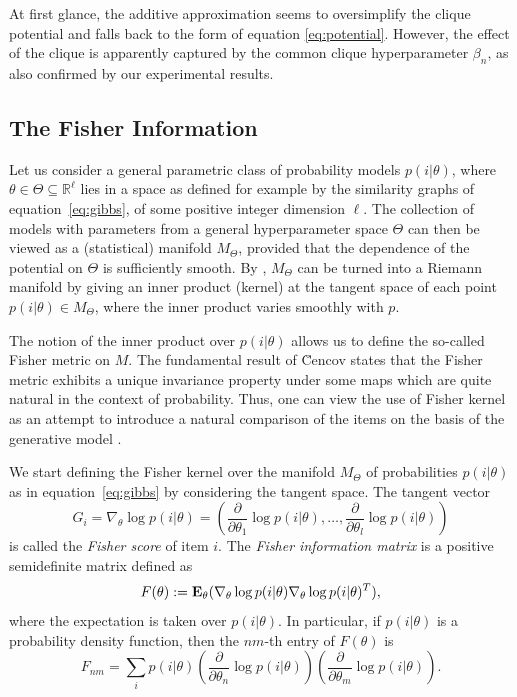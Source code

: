 \documentclass[preprint]{sig-alternate-05-2015}
\begin{document}
At first glance, the additive approximation seems to oversimplify the clique potential and falls back to the form of equation \eqref{eq:potential}. However, the effect of the clique is apparently captured by the common clique hyperparameter $\beta_{n}$, as also confirmed by our experimental results.

\subsection{The Fisher Information}

Let us consider a general parametric class of probability models $p(i| \theta)$, where $\theta\in \Theta \subseteq \mathbb{R}^\ell$ lies in a space as defined for example by the similarity graphs of equation~\eqref{eq:gibbs}, of some positive integer dimension $\ell$. The collection of models with parameters from a general hyperparameter space $\Theta$ can then be viewed as a (statistical) manifold $M_\Theta$, provided that the dependence of the potential on $\Theta$ is sufficiently smooth. By \cite{Jo}, $M_\Theta$ can be turned into a Riemann manifold by giving an inner product (kernel) at the tangent space of each point $p(i| \theta) \in M_\Theta$, where the inner product varies smoothly with $p$. 

The notion of the inner product over $p(i| \theta)$ allows us to define the so-called Fisher metric on $M$. The fundamental result of \u{C}encov \cite{cencov1982} states that the Fisher metric exhibits a unique invariance property under some maps which are quite natural in the context of probability. Thus, one can view the use of Fisher kernel as an attempt to introduce a natural comparison of the items on the basis of the generative model \cite{JH}. 

We start defining the Fisher kernel over the manifold $M_\Theta$ of probabilities $p(i| \theta)$ as in equation~\eqref{eq:gibbs} by considering the tangent space.
The tangent vector 
\begin{equation}
G_i=\nabla_\theta \log p(i|\theta)=\left(
\frac{\partial}{\partial \theta_1} \log p(i|\theta), \ldots,
\frac{\partial}{\partial \theta_l} \log p(i|\theta)\right)
\label{eq:Fisher-score}
\end{equation}
is called the {\em Fisher score} of item $i$. 
The {\em Fisher information matrix} is a positive semidefinite matrix defined as
%
\begin{equation}
F(\theta):= {\bf E_{\theta}}(\nabla _\theta\log p(i|\theta)\nabla _\theta \log p(i|\theta)^T),
\label{eq:fi}
\end{equation}
%
%
%
where the expectation is taken over $p(i|\theta)$. In particular, if $p(i|\theta)$ is a probability density function, then the $nm$-th entry of 
$F(\theta)$  is 
$$ F_{nm}=\sum_{i} p(i|\theta)
\left(\frac{\partial}{\partial \theta_n} \log p(i|\theta)\right)
\left(\frac{\partial}{\partial \theta_m} \log p(i|\theta)\right).$$
\end{document}
